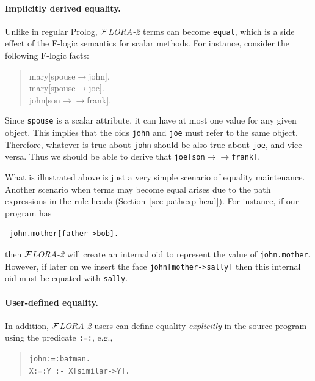 \documentclass[11pt]{article}
\newcommand{\fd}{\ensuremath{{\rightarrow}}}                   %
\newcommand{\mvd}{\ensuremath{{\rightarrow\!\!\!\!\rightarrow}}}  %
\newcommand{\FLORA}{{\mbox{${\cal F}${\small\it LORA}\rm\emph{-2}}}\xspace}
\newcommand{\fl}{\mbox{F-logic}\xspace}
\begin{document}
\paragraph{Implicitly derived equality.}
Unlike in regular Prolog, \FLORA terms can become {\tt equal}, which is a side
effect of the \fl semantics for scalar methods.  For instance, consider the
following \fl facts:
\begin{quote}
mary[spouse{\fd}john]. \\
mary[spouse{\fd}joe]. \\
john[son{\mvd}frank].
\end{quote}
Since {\tt spouse} is a scalar attribute, it can have at most one value for
any given object. This implies that the oids {\tt john} and {\tt joe} must
refer to the same object. Therefore, whatever is true about {\tt john}
should be also true about {\tt joe}, and vice versa.  Thus we should be
able to derive that {\tt joe[son{\mvd}frank]}.

What is illustrated above is just a very simple scenario of equality
maintenance. Another scenario when terms may become equal arises due to the
path expressions in the rule heads (Section~\ref{sec-pathexp-head}).
For instance, if our program has
\begin{verbatim}
 john.mother[father->bob].
\end{verbatim}
then \FLORA will create an internal oid to represent the value of
{\tt john.mother}. However, if later on we insert the face
\verb|john[mother->sally]| then this internal oid must be equated with
{\tt sally}.

\paragraph{User-defined equality.}
In addition, \FLORA users can define equality \emph{explicitly} in the source
program using the predicate {\tt :=:}, e.g.,
\begin{quote}
{\tt john:=:batman.} \\
{\tt X:=:Y :- X[similar->Y].} \\
\end{quote}
\end{document}
